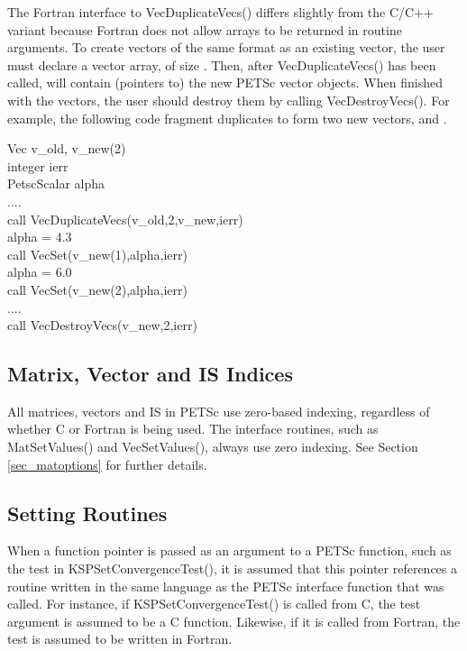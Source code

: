The Fortran interface to VecDuplicateVecs() differs slightly
from the C/C++ variant because Fortran does not allow arrays to be
returned in routine arguments.  To create  vectors of the same
format as an existing vector, the user must declare a vector array,
 of size .  Then, after VecDuplicateVecs() has
been called,  will contain (pointers to) the new PETSc
vector objects.  When finished with the vectors, the user should
destroy them by calling VecDestroyVecs().
For example, the following code fragment
duplicates  to form two new vectors,  and .
\begin{tabbing}
   Vec     v\_old, v\_new(2)\\
   integer ierr\\
   PetscScalar  alpha\\
   ....\\
   call VecDuplicateVecs(v\_old,2,v\_new,ierr)\\
   alpha = 4.3\\
   call VecSet(v\_new(1),alpha,ierr)\\
   alpha = 6.0\\
   call VecSet(v\_new(2),alpha,ierr)\\
   ....\\
   call VecDestroyVecs(v\_new,2,ierr)
\end{tabbing}

\subsection{Matrix, Vector and IS Indices}

All matrices, vectors and IS in PETSc use zero-based indexing, regardless
of whether C or Fortran is being used.  The interface routines, such
as MatSetValues() and VecSetValues(), always use zero
indexing.  See Section \ref{sec_matoptions} for further details.

\subsection{Setting Routines}

When a function pointer is passed as an argument to a PETSc function, such as
the test in KSPSetConvergenceTest(), it is assumed that this pointer references
a routine written in the same language as the PETSc interface function that was
called. For instance, if KSPSetConvergenceTest() is called from C, the test
argument is assumed to be a C function. Likewise, if it is called from Fortran,
the test is assumed to be written in Fortran.

